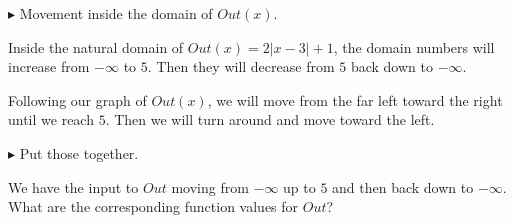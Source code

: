 \documentclass{ximera}
\begin{document}
\textbf{\textcolor{blue!75!black}{$\blacktriangleright$}}  Movement inside the domain of $Out(x)$.



Inside the natural domain of $Out(x) =2|x-3|+1$, the domain numbers will increase from $-\infty$ to $5$.  Then they will decrease from $5$ back down to $-\infty$. 

Following our graph of $Out(x)$, we will move from the far left toward the right until we reach $5$.  Then we will turn around and move toward the left.



\textbf{\textcolor{blue!75!black}{$\blacktriangleright$}}  Put those together. 



We have the input to $Out$ moving from $-\infty$ up to $5$ and then back down to $-\infty$.  What are the corresponding function values for $Out$?
\end{document}
